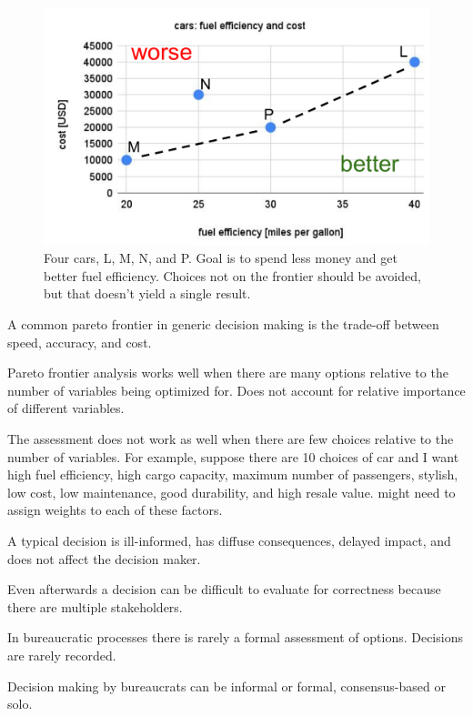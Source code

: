 \begin{figure}[ht]
    \centering
    \includegraphics[width=1\textwidth]{images/pareto_frontier_car_options.pdf}
    \caption{Four cars, L, M, N, and P. Goal is to spend less money and get better fuel efficiency. Choices not on the frontier should be avoided, but that doesn't yield a single result.}
    \label{fig:pareto_frontier_cars}
\end{figure}

A common pareto frontier in generic decision making is the trade-off between speed, accuracy, and cost. 

Pareto frontier analysis works well when there are many options relative to the number of variables being optimized for. Does not account for relative importance of different variables.

The assessment does not work as well when there are few choices relative to the number of variables. For example, suppose there are 10 choices of car and I want high fuel efficiency, high cargo capacity, maximum number of passengers, stylish, low cost, low maintenance, good durability, and high resale value. might need to assign weights to each of these factors. 

A typical decision is ill-informed, has diffuse consequences, delayed impact, and does not affect the decision maker. 

Even afterwards a decision can be difficult to evaluate for correctness because there are multiple stakeholders.

In bureaucratic processes there is rarely a formal assessment of options. 
Decisions are rarely recorded. 

Decision making by bureaucrats can be informal or formal, consensus-based or solo. 

